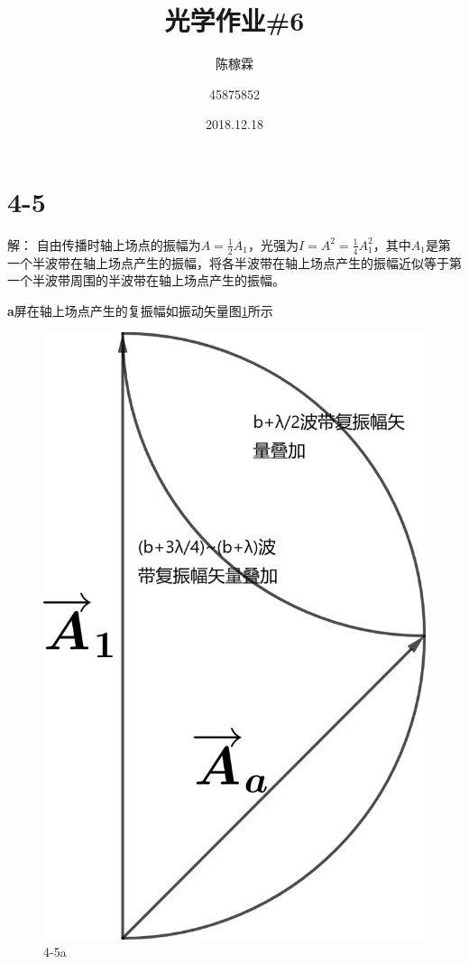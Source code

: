 \documentclass[10pt,a4paper]{article}
\title{光学作业\#6}
\author{陈稼霖 \and 45875852}
\date{2018.12.18}
\begin{document}
\maketitle
\section*{4-5}解：
自由传播时轴上场点的振幅为$A=\frac{1}{2}A_1$，光强为$I=A^2=\frac{1}{4}A_1^2$，其中$A_1$是第一个半波带在轴上场点产生的振幅，将各半波带在轴上场点产生的振幅近似等于第一个半波带周围的半波带在轴上场点产生的振幅。

\textbf{a}屏在轴上场点产生的复振幅如振动矢量图\ref{OpticsHomework_6_4-5a}所示
\begin{figure}[h]
\centering
\includegraphics[scale=.12]{OpticsHomework_6_4-5a(tailored&marked).png}
\caption{4-5a}\label{OpticsHomework_6_4-5a}
\end{figure}
\end{document}
